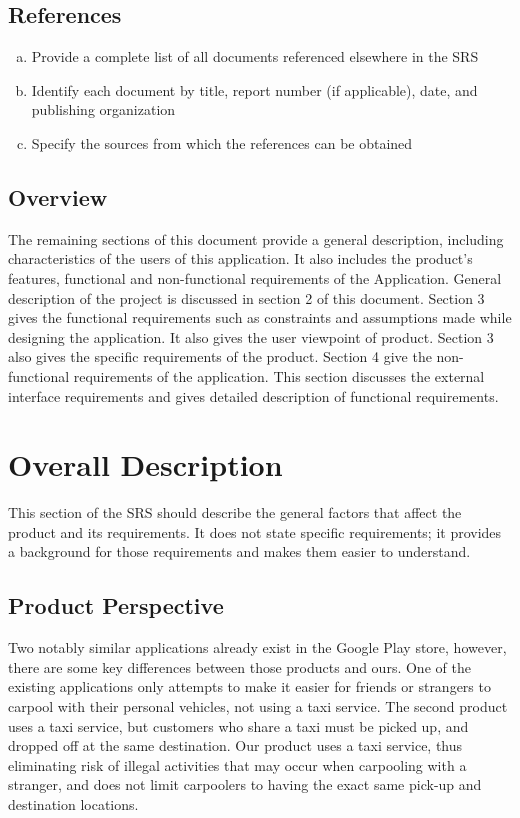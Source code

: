 \documentclass[english]{article}
\begin{document}
\subsection{References}
\label{sub:references}
\begin{enumerate}[a)]
	\item Provide a complete list of all documents referenced elsewhere in the SRS
	\item Identify each document by title, report number (if applicable), date, and publishing organization
	\item Specify the sources from which the references can be obtained
\end{enumerate}

\subsection{Overview}
\label{sub:overview}
The remaining sections of this document provide a general description, including characteristics of the users of this application. It also includes the product's features, functional and non-functional requirements of the Application.  General description of the project is discussed in section 2 of this document.  Section 3 gives the functional requirements such as constraints and assumptions made while designing the application.  It also gives the user viewpoint of product.  Section 3 also gives the specific requirements of the product. Section 4 give the non-functional requirements of the application. This section discusses the external interface requirements and gives detailed description of functional requirements.


\section{Overall Description}
\label{sec:overall_description}

This section of the SRS should describe the general factors that affect the product and its requirements. It does not state specific requirements; it provides a background for those requirements and makes them easier to understand.

\subsection{Product Perspective}
\label{sub:product_perspective}
Two notably similar applications already exist in the Google Play store, however, there are some key
differences between those products and ours. One of the existing applications only attempts to make it easier for friends or strangers to carpool with their personal vehicles, not using a taxi service. The second product uses a taxi service, but customers who share a taxi must be picked up, and dropped off at the same destination. Our product uses a taxi service, thus eliminating risk of illegal activities that may occur when carpooling with a stranger, and does not limit carpoolers to having the exact same pick-up and destination locations.\\
\end{document}
